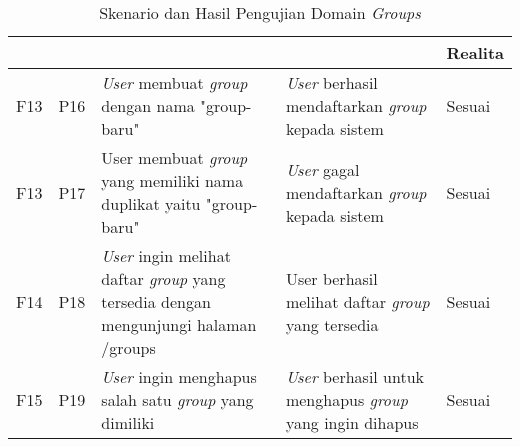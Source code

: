 \bgroup
\begin{table}[ht]
  \def\arraystretch{1.3}
  \caption{Skenario dan Hasil Pengujian Domain \textit{Groups}}
  \label{tab:pengujian-domain-groups}
  \centering
  \begin{tabular}{|p{2cm}|p{2cm}|p{3cm}|p{3cm}|p{1.5cm}|}
    \hline
    \centering{ID Fungsional} & \centering{ID Pengujian} & \centering{Skenario}                                                                               & \centering{Ekspektasi}                                                   & Realita \\
    \hline
    F13                       & P16                      & \textit{User} membuat \textit{group} dengan nama "group-baru"                                      & \textit{User} berhasil mendaftarkan \textit{group} kepada sistem         & Sesuai  \\
    \hline
    F13                       & P17                      & {User} membuat \textit{group} yang memiliki nama duplikat yaitu "group-baru"                       & \textit{User} gagal mendaftarkan \textit{group} kepada sistem            & Sesuai  \\
    \hline
    F14                       & P18                      & \textit{User} ingin melihat daftar \textit{group} yang tersedia dengan mengunjungi halaman /groups & User berhasil melihat daftar \textit{group} yang tersedia                & Sesuai  \\
    \hline
    F15                       & P19                      & \textit{User} ingin menghapus salah satu \textit{group} yang dimiliki                              & \textit{User} berhasil untuk menghapus \textit{group} yang ingin dihapus & Sesuai  \\
    \hline
  \end{tabular}
\end{table}
\egroup

